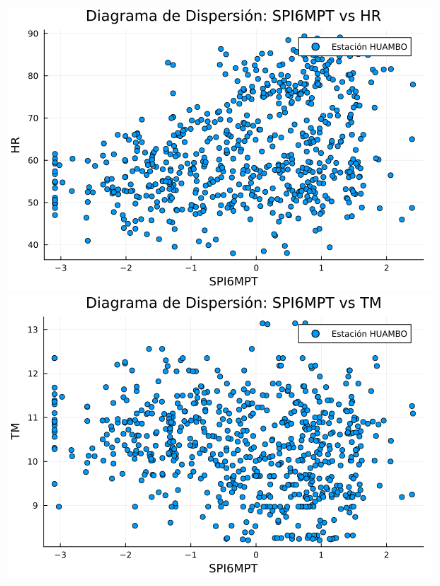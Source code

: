 \begin{figure}[htbp]
\begin{minipage}{0.32\textwidth}
\end{minipage}

\vspace{0.5cm}  %

\begin{minipage}{0.32\textwidth}
    \centering
    \includegraphics[width=\linewidth]{Capitulos/Scaterplot/HUAMBO_SPI6MPT_vs_HR.png}
\end{minipage}\hfill
\begin{minipage}{0.32\textwidth}
    \centering
    \includegraphics[width=\linewidth]{Capitulos/Scaterplot/HUAMBO_SPI6MPT_vs_TM.png}
\end{minipage}\hfill
\begin{minipage}{0.32\textwidth}
    \centering

\end{minipage}
\end{figure}
